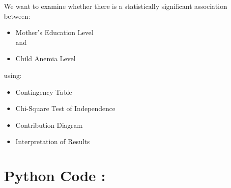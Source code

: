 \documentclass[
]{article}
\begin{document}
We want to examine whether there is a statistically significant
association between:

\begin{itemize}
\item
  Mother's Education Level\\
  and
\item
  Child Anemia Level
\end{itemize}

using:

\begin{itemize}
\item
  Contingency Table
\item
  Chi-Square Test of Independence
\item
  Contribution Diagram
\item
  Interpretation of Results
\end{itemize}

\section{\texorpdfstring{\textbf{Python Code
:}}{Python Code :}}\label{python-code-8}
\end{document}
